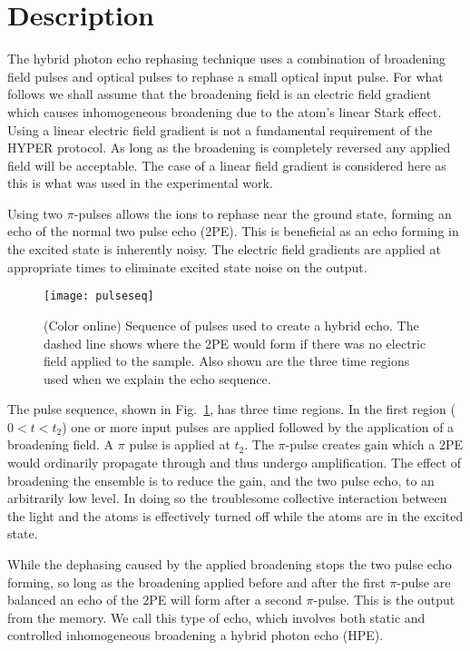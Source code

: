\documentclass[superscriptaddress,pra,twocolumn,showpacs,amsmath,amssymb,aps,a4paper]{revtex4}
\begin{document}
\section{Description}

The hybrid photon echo rephasing technique uses a combination of
broadening field pulses and optical pulses to rephase a small optical
input pulse. For what follows we shall assume that the broadening
field is an electric field gradient which causes inhomogeneous
broadening due to the atom's linear Stark effect. Using a linear
electric field gradient is not a fundamental requirement of the HYPER
protocol. As long as the broadening is completely reversed any applied
field will be acceptable. The case of a linear field gradient is
considered here as this is what was used in the experimental work.

Using two $\pi$-pulses allows the ions to rephase near the ground
state, forming an echo of the normal two pulse echo (2PE). This is
beneficial as an echo forming in the excited state is inherently
noisy. The electric field gradients are applied at appropriate times
to eliminate excited state noise on the output.

\begin{figure}%
  \centering
  \texttt{[image: pulseseq]}
\caption{\label{fig:pulseseq} (Color online)
Sequence of pulses used to create a hybrid echo. The dashed line shows
where the 2PE would form if there was no electric field applied to the
sample. Also shown are the three time regions used when we explain
the echo sequence.
}
\end{figure}

The pulse sequence, shown in Fig.~\ref{fig:pulseseq}, has three time
regions. In the first region ($0 < t < t_2$) one or more input pulses are
applied followed by the application of a broadening field. A $\pi$
pulse is applied at $t_2$.  The $\pi$-pulse creates  gain 
which a 2PE would ordinarily propagate through and thus undergo 
amplification. The effect of broadening the ensemble is to reduce the gain, and
the two pulse echo, to an arbitrarily low level.  In doing so the 
troublesome collective interaction between the light and the atoms is
effectively turned off while the atoms are in the excited state.

While the dephasing caused by the applied broadening stops the two
pulse echo forming, so long as the broadening applied before and after the
first $\pi$-pulse are balanced an echo of the 2PE will form after a
second $\pi$-pulse. This is the output from the memory. We call this
type of echo, which involves both static and controlled inhomogeneous
broadening a hybrid photon echo (HPE).
\end{document}
